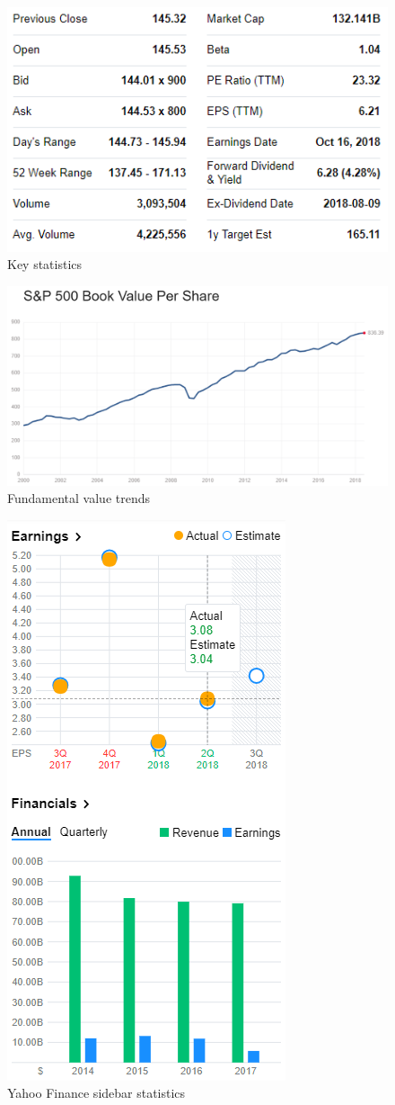 \documentclass{article}
\begin{document}
\vspace{10pt}

\begin{figure}[!htb]
    \centering
    \includegraphics[width=.64\textwidth]{imgs/11.5.png}
    \caption{Key statistics}
\end{figure}

\vspace{10pt}

\begin{figure}[!htb]
    \centering
    \includegraphics[width=\textwidth]{imgs/12.png}
    \caption{Fundamental value trends}
\end{figure}

\vspace{10pt}

\begin{figure}[!htb]
    \centering
    \includegraphics[width=.35\textwidth]{imgs/13.png}
    \caption{Yahoo Finance sidebar statistics}
\end{figure}
\end{document}

